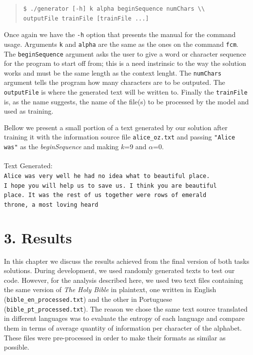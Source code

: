 \documentclass[12pt]{article}
\begin{document}
\begin{quote}
\begin{verbatim}
$ ./generator [-h] k alpha beginSequence numChars \\
outputFile trainFile [trainFile ...]
\end{verbatim}
\end{quote}

Once again we have the \texttt{-h} option that presents the manual for the 
command usage.
Arguments \texttt{k} and \texttt{alpha} are the same as the ones on the 
command \texttt{fcm}.
The \texttt{beginSequence} argument asks the user to give a word or character
sequence for the program to start off from; this is a need instrinsic to the
way the solution works and must be the same length as the context lenght.
The \texttt{numChars} argument tells the program how many characters are to 
be outputed.
The \texttt{outputFile} is where the generated text will be written to.
Finally the \texttt{trainFile} is, as the name suggests, the name of the 
file(s) to be processed by the model and used as training.

Bellow we present a small portion of a text generated by our solution 
after training it with the information source file \texttt{alice\_oz.txt}
and passing \texttt{"Alice was"} as the {\it beginSequence\/} and making \(k\)=9 
and $\alpha$=0.\\\\
Text Generated:\\
\texttt{Alice was very well he had no idea what to beautiful place. \\
I hope you will help us to save us. I think you are beautiful\\
place. It was the rest of us together were rows of emerald\\
throne, a most loving heard }

\newpage
\section*{3. Results}

In this chapter we discuss the results achieved from the final version of 
both tasks solutions. 
During development, we used randomly generated texts to test our code.
However, for the analysis described here, we used two text files
containing the same version of {\it The Holy Bible\/} in plaintext, one 
written in English (\texttt{bible\_en\_processed.txt}) and the other in 
Portuguese (\texttt{bible\_pt\_processed.txt}).
The reason we chose the same text source translated in different languages
was to evaluate the entropy of each language and compare them in terms of 
average quantity of information per character of the alphabet.
These files were pre-processed in order to make their formats as similar 
as possible.
\end{document}

